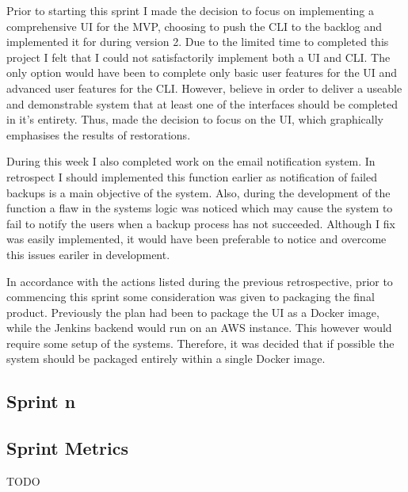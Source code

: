     Prior to starting this sprint I made the decision to focus on implementing a comprehensive UI for the MVP, choosing to push the CLI to the backlog and implemented it for during version 2. Due to the limited time to completed this project I felt that I could not satisfactorily implement both a UI and CLI. The only option would have been to complete only basic user features for the UI and advanced user features for the CLI. However, believe in order to deliver a useable and demonstrable system that at least one of the interfaces should be completed in it's entirety. Thus, made the decision to focus on the UI, which graphically emphasises the results of restorations. 
   
    During this week I also completed work on the email notification system. In retrospect I should implemented this function earlier as notification of failed backups is a main objective of the system. Also, during the development of the function a flaw in the systems logic was noticed which may cause the system to fail to notify the users when a backup process has not succeeded. Although I fix was easily implemented, it would have been preferable to notice and overcome this issues eariler in development.
    
   In accordance with the actions listed during the previous retrospective, prior to commencing this sprint some consideration was given to packaging the final product. Previously the plan had been to package the UI as a Docker image, while the Jenkins backend would run on an AWS instance. This however would require some setup of the systems. Therefore, it was decided that if possible the system should be packaged entirely within a single Docker image.
   
	\subsection{Sprint n}

	\subsection{Sprint Metrics}
	TODO

	